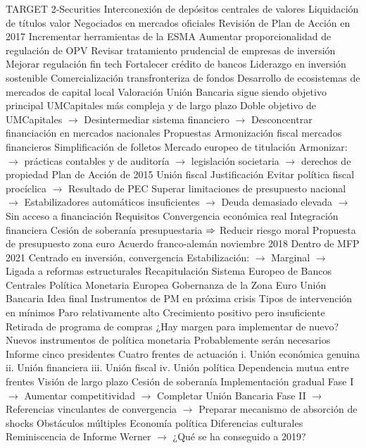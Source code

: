 \documentclass{nuevotema}
\begin{document}
\begin{esquemal}
			\3 TARGET 2-Securities
				\4 Interconexión de depósitos centrales de valores
				\4 Liquidación de títulos valor
				\4[] Negociados en mercados oficiales
			\3 Revisión de Plan de Acción en 2017
				\4 Incrementar herramientas de la ESMA
				\4 Aumentar proporcionalidad de regulación de OPV
				\4 Revisar tratamiento prudencial de empresas de inversión
				\4 Mejorar regulación fin tech
				\4 Fortalecer crédito de bancos
				\4 Liderazgo en inversión sostenible
				\4 Comercialización transfronteriza de fondos
				\4 Desarrollo de ecosistemas de mercados de capital local
			\3 Valoración
				\4 Unión Bancaria sigue siendo objetivo principal
				\4 UMCapitales más compleja y de largo plazo
				\4 Doble objetivo de UMCapitales
				\4[] $\to$ Desintermediar sistema financiero
				\4[] $\to$ Desconcentrar financiación en mercados nacionales
			\3 Propuestas
				\4 Armonización fiscal mercados financieros
				\4 Simplificación de folletos
				\4 Mercado europeo de titulación
				\4 Armonizar:
				\4[] $\to$ prácticas contables y de auditoría
				\4[] $\to$ legislación societaria
				\4[] $\to$ derechos de propiedad
				\4 Plan de Acción de 2015
		\2 Unión fiscal
			\3 Justificación
				\4 Evitar política fiscal procíclica
				\4[] $\to$ Resultado de PEC
				\4 Superar limitaciones de presupuesto nacional
				\4[] $\to$ Estabilizadores automáticos insuficientes
				\4[] $\to$ Deuda demasiado elevada
				\4[] $\to$ Sin acceso a financiación
			\3 Requisitos
				\4 Convergencia económica real
				\4 Integración financiera
				\4 Cesión de soberanía presupuestaria
				\4[] $\Rightarrow$ Reducir riesgo moral
			\3 Propuesta de presupuesto zona euro
				\4 Acuerdo franco-alemán noviembre 2018
				\4 Dentro de MFP 2021
				\4 Centrado en inversión, convergencia
				\4 Estabilización:
				\4[] $\to$ Marginal
				\4[] $\to$ Ligada a reformas estructurales
	\1[] 
		\2 Recapitulación
			\3 Sistema Europeo de Bancos Centrales
			\3 Política Monetaria Europea
			\3 Gobernanza de la Zona Euro
			\3 Unión Bancaria
		\2 Idea final
			\3 Instrumentos de PM en próxima crisis
				\4 Tipos de intervención en mínimos
				\4[] Paro relativamente alto
				\4[] Crecimiento positivo pero insuficiente
				\4 Retirada de programa de compras
				\4[] ¿Hay margen para implementar de nuevo?
				\4 Nuevos instrumentos de política monetaria
				\4[] Probablemente serán necesarios
			\3 Informe cinco presidentes
				\4 Cuatro frentes de actuación
				\4[] i. Unión económica genuina
				\4[] ii. Unión financiera
				\4[] iii. Unión fiscal
				\4[] iv. Unión política
				\4 Dependencia mutua entre frentes
				\4 Visión de largo plazo
				\4 Cesión de soberanía
				\4 Implementación gradual
				\4[] Fase I
				\4[] $\to$ Aumentar competitividad
				\4[] $\to$ Completar Unión Bancaria
				\4[] Fase II
				\4[] $\to$ Referencias vinculantes de convergencia
				\4[] $\to$ Preparar mecanismo de absorción de shocks
				\4 Obstáculos múltiples
				\4[] Economía política
				\4[] Diferencias culturales
				\4 Reminiscencia de Informe Werner
				\4[] $\to$ ¿Qué se ha conseguido a 2019?
\end{esquemal}
\end{document}
